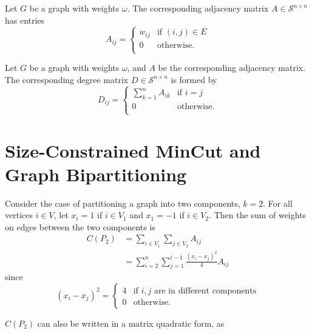 \begin{definition}
 Let $G$ be a graph with weights $\omega$.
The corresponding adjacency matrix $A \in \mathcal{S}^{n \times n}$ has entries
\[
A_{ij} = \begin{cases}
  w_{ij} & \text{if } (i,j) \in E \\
  0      & \text{otherwise.} \\
\end{cases}
\]
\end{definition}

\begin{definition}
 Let $G$ be a graph with weights $\omega$, and $A$ be
the corresponding adjacency matrix. The corresponding degree
matrix $D \in \mathcal{S}^{n \times n}$ is formed by 
\[
D_{ij} = \begin{cases}
  \sum_{k = 1}^n A_{ik} & \text{if } i = j \\
  0                     & \text{otherwise.} \\
\end{cases}
\]
\end{definition}

\section{Size-Constrained MinCut and Graph Bipartitioning}

Consider the case of partitioning a graph into two components, $k = 2$.
For all vertices $i \in V$, let $x_i = 1$ if $i \in V_1$ and
$x_1 = -1$ if $i \in V_2$. Then the sum of weights on edges between the
two components is
\begin{align*}
C(P_2)
&= \sum_{i \in V_1} \sum_{j \in V_2} A_{ij} \\
&= \sum_{i = 2}^n \sum_{j = 1}^{i-1} \frac{(x_i - x_j)^2}{4} A_{ij} 
\end{align*}
since
\[ (x_i - x_j)^2 = \begin{cases}
	4 & \mbox{if } i,j \mbox{ are in different components} \\
	0 & \mbox{otherwise.}
\end{cases}\]

$C(P_2)$ can also be written in a matrix quadratic form, as

